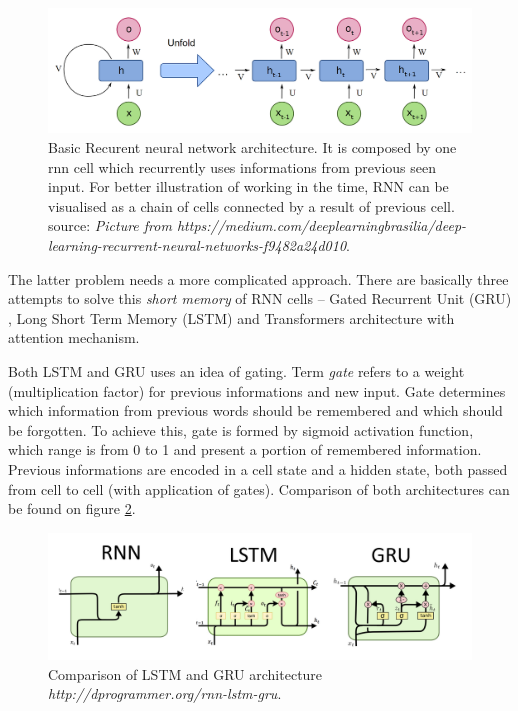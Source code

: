 \begin{figure}[h]
\centering
\includegraphics[width=1\columnwidth]{../img/rnn}
\protect\caption{Basic Recurent neural network architecture. It is composed by one rnn cell which recurrently uses informations from previous seen input. For better illustration of working in the time, RNN can be visualised as a chain of cells connected by a result of previous cell. source: \textit{Picture from https://medium.com/deeplearningbrasilia/deep-learning-recurrent-neural-networks-f9482a24d010}.}
\label{pic:rnn}
\end{figure}
 
 
 
The latter problem needs a more complicated approach. There are basically three attempts to solve this \textit{short memory} of RNN cells -- Gated Recurrent Unit (GRU) \citep{Cho2014}, Long Short Term Memory (LSTM) \citep{Hochreiter1997} and Transformers architecture \citep{Vaswani2017} with attention mechanism.
\par
Both LSTM and GRU uses an idea of gating. Term \textit{gate} refers to a weight (multiplication factor) for previous informations and new input. Gate determines which information from previous words should be remembered and which should be forgotten. To achieve this, gate is formed by sigmoid activation function, which range is from 0 to 1 and present a portion of remembered information. Previous informations are encoded in a cell state and a hidden state, both passed from cell to cell (with application of gates). Comparison of both architectures can be found on figure \ref{pic:lstm_gru}.

\begin{figure}[h]
\centering
\includegraphics[width=1\columnwidth]{../img/lstm_gru}
\protect\caption{Comparison of LSTM and GRU architecture \textit{http://dprogrammer.org/rnn-lstm-gru}.}
\label{pic:lstm_gru}
\end{figure}
